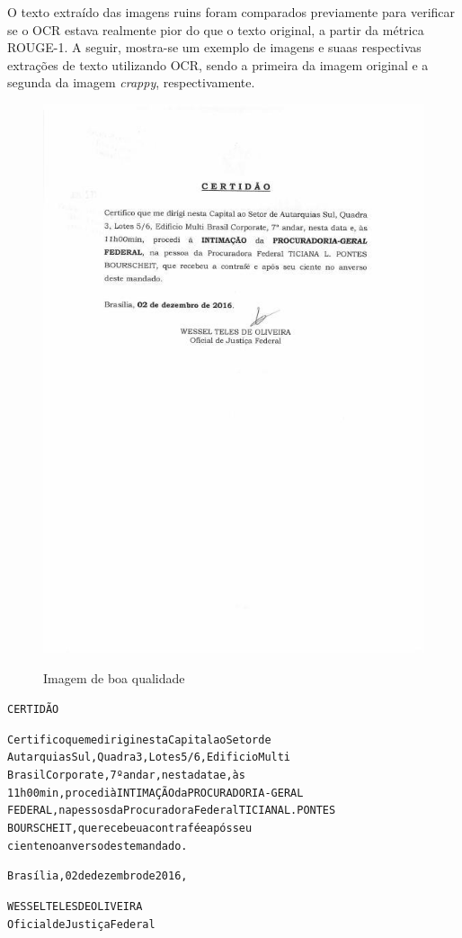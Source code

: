 O texto extraído das imagens ruins foram comparados previamente para verificar se o OCR estava realmente pior do que o texto original, a partir da métrica ROUGE-1. A seguir, mostra-se um exemplo de imagens e suaas respectivas extrações de texto utilizando OCR, sendo a primeira da imagem original e a segunda da imagem \textit{crappy}, respectivamente.

\begin{figure}[H]
  \centering
  \caption{Imagem de boa qualidade}
  \includegraphics[scale=.6]{figuras/good-image-extracted.jpg}
  \label{fig:good-image-extracted}
\end{figure}

\begin{alltt}
          CERTIDÃO

          Certifico que me dirigi nesta Capital ao Setor de
          Autarquias Sul, Quadra 3, Lotes 5/6, Edificio Multi
          Brasil Corporate, 7º andar, nesta data e, às
          11h00min, procedi à INTIMAÇÃO da PROCURADORIA-GERAL
          FEDERAL, na pessos da Procuradora Federal TICIANA L. PONTES
          BOURSCHEIT, que recebeu a contrafé e após seu
          ciente no anverso deste mandado.

          Brasília, 02 de dezembro de 2016,

          WESSEL TELES DE OLIVEIRA
          Oficial de Justiça Federal
\end{alltt}

